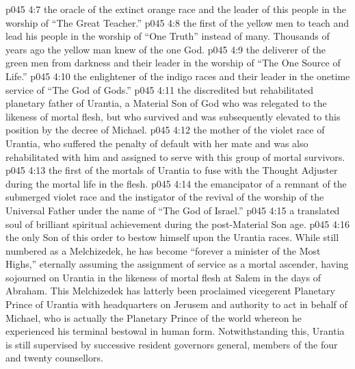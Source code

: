 \vs p045 4:7 \bibnobreakspace {} the oracle of the extinct orange race and the leader of this people in the worship of “The Great Teacher.”
\vs p045 4:8 \bibnobreakspace {} the first of the yellow men to teach and lead his people in the worship of “One Truth” instead of many. Thousands of years ago the yellow man knew of the one God.
\vs p045 4:9 \bibnobreakspace {} the deliverer of the green men from darkness and their leader in the worship of “The One Source of Life.”
\vs p045 4:10 \bibnobreakspace {} the enlightener of the indigo races and their leader in the onetime service of “The God of Gods.”
\vs p045 4:11 \bibnobreakspace {} the discredited but rehabilitated planetary father of Urantia, a Material Son of God who was relegated to the likeness of mortal flesh, but who survived and was subsequently elevated to this position by the decree of Michael.
\vs p045 4:12 \bibnobreakspace {} the mother of the violet race of Urantia, who suffered the penalty of default with her mate and was also rehabilitated with him and assigned to serve with this group of mortal survivors.
\vs p045 4:13 \bibnobreakspace {} the first of the mortals of Urantia to fuse with the Thought Adjuster during the mortal life in the flesh.
\vs p045 4:14 \bibnobreakspace {} the emancipator of a remnant of the submerged violet race and the instigator of the revival of the worship of the Universal Father under the name of “The God of Israel.”
\vs p045 4:15 \bibnobreakspace {} a translated soul of brilliant spiritual achievement during the post\hyp{}Material Son age.
\vs p045 4:16 \bibnobreakspace {} the only Son of this order to bestow himself upon the Urantia races. While still numbered as a Melchizedek, he has become “forever a minister of the Most Highs,” eternally assuming the assignment of service as a mortal ascender, having sojourned on Urantia in the likeness of mortal flesh at Salem in the days of Abraham. This Melchizedek has latterly been proclaimed vicegerent Planetary Prince of Urantia with headquarters on Jerusem and authority to act in behalf of Michael, who is actually the Planetary Prince of the world whereon he experienced his terminal bestowal in human form. Notwithstanding this, Urantia is still supervised by successive resident governors general, members of the four and twenty counsellors.
